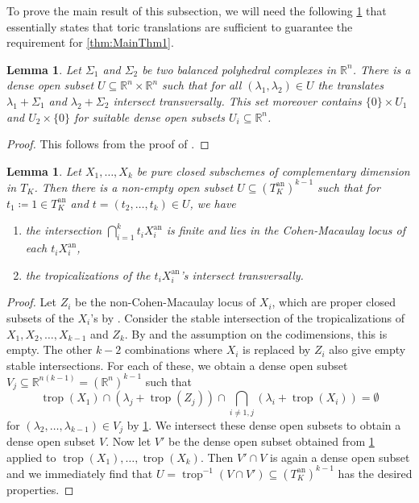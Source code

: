\documentclass[12pt,reqno,a4paper]{amsart}
\theoremstyle{theoremstyle}
\newtheorem{lemma}[theorem]{Lemma}
\theoremstyle{examplestyle}
\theoremstyle{algorithmstyle}
\newcommand{\an}{{\mathrm{an}}}
\DeclareMathOperator{\trop}{trop}
\begin{document}
To prove the main result of this subsection, we will need the following \cref{prop:TranslationProperCM} that essentially states that toric translations are sufficient to guarantee the requirement for \cref{thm:MainThm1}.

\begin{lemma}\label{lem:GenericStableIntersection}
  Let $\Sigma_{1}$ and $\Sigma_{2}$ be two balanced  polyhedral complexes in $\mathbb{R}^{n}$. There is a dense open subset $U\subseteq{\mathbb{R}^{n}\times\mathbb{R}^{n}}$ such that for all $(\lambda_{1},\lambda_{2})\in{U}$ the translates $\lambda_{1}+\Sigma_{1}$ and $\lambda_{2}+\Sigma_{2}$ intersect transversally. This set moreover contains $\{0\}\times{U_{1}}$ and $U_{2}\times{\{0\}}$ for suitable dense open subsets $U_{i}\subseteq \mathbb{R}^{n}$. %
\end{lemma}
\begin{proof}
  This follows from the proof of \cite[Proposition 3.6.12]{MS15}.
\end{proof}



\begin{lemma}\label{prop:TranslationProperCM}
  Let $X_{1}, \dots, X_{k}$ be pure closed subschemes of complementary dimension in $T_K$.
  Then there is a non-empty open subset $U\subseteq (T^{\an}_K)^{k-1}$ such that for $t_1\coloneqq 1\in T^{\an}_K$ and $t=(t_{2},\dots ,t_{k})\in{U}$, we have
  \begin{enumerate}
  \item the intersection $\bigcap_{i=1}^k t_{i}X^{\an}_{i}$ is finite and lies in the Cohen-Macaulay locus of each $t_iX^{\an}_i$,
  \item the tropicalizations of the $t_{i}X^{\an}_{i}$'s intersect transversally.
  \end{enumerate}
\end{lemma}
\begin{proof}
  Let $Z_i$ be the non-Cohen-Macaulay locus of $X_i$, which are proper closed subsets of the $X_{i}$'s by \cite[\href{https://stacks.math.columbia.edu/tag/00RG}{Lemma 00RG}]{stacks-project}. Consider the stable intersection of the tropicalizations of $X_{1}, X_{2}, \dots, X_{k-1}$ and $Z_{k}$. By \cite[Theorem 3.6.10]{MS15} and the assumption on the codimensions, this is empty. The other $k-2$ combinations where $X_{i}$ is replaced by $Z_{i}$ also give empty stable intersections. For each of these, we obtain a dense open subset $V_{j}\subseteq\mathbb{R}^{n(k-1)}=(\mathbb{R}^n)^{k-1}$ such that
  \begin{equation*}
   \trop(X_{1})\cap  (\lambda_{j}+\trop(Z_{j}))\cap\bigcap_{i\neq{1,j}}(\lambda_{i}+  \trop(X_{i}))=\emptyset
  \end{equation*}
  for $(\lambda_{2},\dots,\lambda_{k-1})\in V_{j}$ by \cref{lem:GenericStableIntersection}. %
%
We intersect these dense open subsets to obtain a dense open subset $V$. Now let $V'$ be the dense open subset obtained from \cref{lem:GenericStableIntersection} applied to $\trop(X_{1}),\dots,\trop(X_{k})$. Then $V'\cap V$ is again a dense open subset and   %
%
%
%
we immediately find that $U=\trop^{-1}(V\cap V')\subseteq (T^{\an}_{K})^{k-1}$ has the desired properties.
\end{proof}
\end{document}
